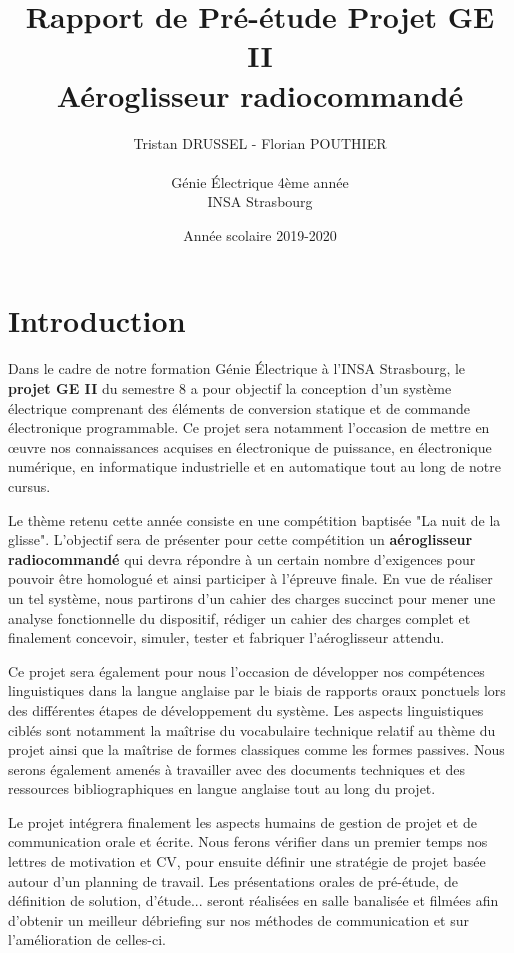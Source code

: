 \documentclass[a4paper,12pt]{report}
\title{Rapport de Pré-étude Projet GE II\\Aéroglisseur radiocommandé}
\author{Tristan DRUSSEL - Florian POUTHIER \\ \\ Génie Électrique 4ème année\\ INSA Strasbourg}
\date{Année scolaire 2019-2020}
\begin{document}
	\begin{titlepage}
		\maketitle
	\end{titlepage}
	\tableofcontents
	\newpage
	
	\section{Introduction}
	
	\vspace{-1em}
	
	Dans le cadre de notre formation Génie Électrique à l'INSA Strasbourg, le \textbf{projet GE II} du semestre 8 a pour objectif la conception d'un système électrique comprenant des éléments de conversion statique et de commande électronique programmable. Ce projet sera notamment l'occasion de mettre en œuvre nos connaissances acquises en électronique de puissance, en électronique numérique, en informatique industrielle et en automatique tout au long de notre cursus. 
	
	Le thème retenu cette année consiste en une compétition baptisée "La nuit de la glisse". L'objectif sera de présenter pour cette compétition un \textbf{aéroglisseur radiocommandé} qui devra répondre à un certain nombre d'exigences pour pouvoir être homologué et ainsi participer à l'épreuve finale. En vue de réaliser un tel système, nous partirons d'un cahier des charges succinct pour mener une analyse fonctionnelle du dispositif, rédiger un cahier des charges complet et finalement concevoir, simuler, tester et fabriquer l'aéroglisseur attendu.
	
	Ce projet sera également pour nous l'occasion de développer nos compétences linguistiques dans la langue anglaise par le biais de rapports oraux ponctuels lors des différentes étapes de développement du système. Les aspects linguistiques ciblés sont notamment la maîtrise du vocabulaire technique relatif au thème du projet ainsi que la maîtrise de formes classiques comme les formes passives. Nous serons également amenés à travailler avec des documents techniques et des ressources bibliographiques en langue anglaise tout au long du projet.
	
	Le projet intégrera finalement les aspects humains de gestion de projet et de communication orale et écrite. Nous ferons vérifier dans un premier temps nos lettres de motivation et CV, pour ensuite définir une stratégie de projet basée autour d'un planning de travail. Les présentations orales de pré-étude, de définition de solution, d'étude... seront réalisées en salle banalisée et filmées afin d'obtenir un meilleur débriefing sur nos méthodes de communication et sur l'amélioration de celles-ci.
	
\end{document}
